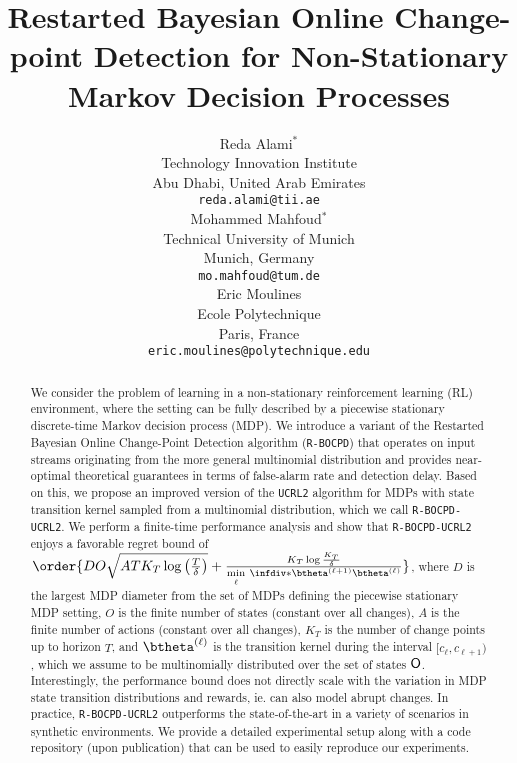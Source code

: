 \documentclass{article} %
\title{Restarted Bayesian Online Change-point Detection for Non-Stationary Markov Decision Processes}
\author{Reda Alami$^*$ \\
Technology Innovation Institute \\
Abu Dhabi, United Arab Emirates \\
\texttt{reda.alami@tii.ae} \\
\And
\hspace{-20em}Mohammed Mahfoud$^*$\\
\hspace{-20em}Technical University of Munich \\
\hspace{-20em}Munich, Germany\\
\hspace{-20em}\texttt{mo.mahfoud@tum.de} \\
\AND %
\hspace{0em}Eric Moulines \\
\hspace{0em}Ecole Polytechnique \\
\hspace{0em}Paris, France \\
\hspace{0em}\texttt{eric.moulines@polytechnique.edu} \\
}
\begin{document}
\doparttoc 
\faketableofcontents

\maketitle
\def\thefootnote{*}
\begin{abstract}
We consider the problem of learning in a non-stationary reinforcement learning (RL) environment, where the setting can be fully described by a piecewise stationary discrete-time Markov decision process (MDP). We introduce a variant of the Restarted Bayesian Online Change-Point Detection algorithm (\texttt{R-BOCPD}) that operates on input streams originating from the more general multinomial distribution and provides near-optimal theoretical guarantees in terms of false-alarm rate and detection delay. Based on this, we propose an improved version of the \texttt{UCRL2} algorithm for MDPs with state transition kernel sampled from a multinomial distribution, which we call \texttt{R-BOCPD-UCRL2}. We perform a finite-time performance analysis and show that \texttt{R-BOCPD-UCRL2} enjoys a favorable regret bound of $\order{D O \sqrt{A T K_T \log\left (\frac{T}{\delta} \right)} + \frac{K_T \log \frac{K_T}{\delta}}{\min\limits_\ell \: \infdiv*{\btheta^{(\ell+1)}}{\btheta^{(\ell)}}}}$, where $D$ is the largest MDP diameter from the set of MDPs defining the piecewise stationary MDP setting, $O$ is the finite number of states (constant over all changes), $A$ is the finite number of actions (constant over all changes), $K_T$ is the number of change points up to horizon $T$, and $\btheta^{(\ell)}$ is the transition kernel during the interval $[c_\ell, c_{\ell+1})$, which we assume to be multinomially distributed over the set of states ${\mathsf{O}}$. Interestingly, the performance bound does not directly scale with the variation in MDP state transition distributions and rewards, ie. can also model abrupt changes.  In practice, \texttt{R-BOCPD-UCRL2} outperforms the state-of-the-art in a variety of scenarios in synthetic environments. We provide a detailed experimental setup along with a code repository (upon publication) that can be used to easily reproduce our experiments. 




\end{abstract}
\end{document}
